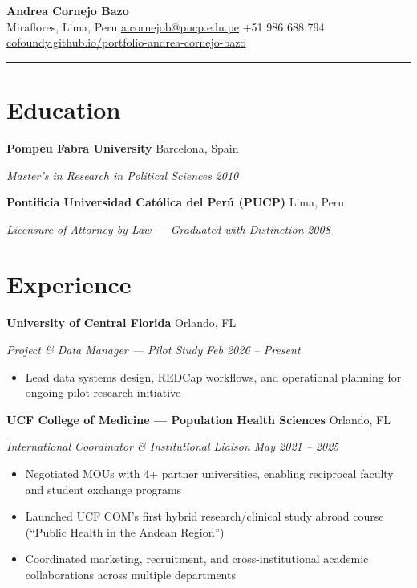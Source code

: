 \documentclass[10pt,letterpaper]{article}
\newcommand{\entry}[4]{%
  \noindent\textbf{#1} \hfill #2 \par\nopagebreak
  \textit{#3} \hfill \textit{#4} \par\nopagebreak
}
\begin{document}
\begin{center}
  {\LARGE\bfseries Andrea Cornejo Bazo} \\[3pt]
  \enspace Miraflores, Lima, Peru
  \quad{}\enspace \href{mailto:a.cornejob@pucp.edu.pe}{a.cornejob@pucp.edu.pe}
  \quad{}\enspace +51 986 688 794
  \\[2pt]
  \enspace \href{https://cofoundy.github.io/portfolio-andrea-cornejo-bazo}{cofoundy.github.io/portfolio-andrea-cornejo-bazo}
\end{center}

\vspace{-0.4em}
\noindent\rule{\textwidth}{0.8pt}
\vspace{-0.6em}

\section{Education}

\entry{Pompeu Fabra University}{Barcelona, Spain}{Master's in Research in Political Sciences}{2010}
\vspace{0.2em}

\entry{Pontificia Universidad Cat\'olica del Per\'u (PUCP)}{Lima, Peru}{Licensure of Attorney by Law --- Graduated with Distinction}{2008}
\vspace{0.2em}

\section{Experience}

\entry{University of Central Florida}{Orlando, FL}{Project \& Data Manager --- Pilot Study}{Feb 2026 -- Present}
\begin{itemize}
  \item Lead data systems design, REDCap workflows, and operational planning for ongoing pilot research initiative
\end{itemize}
\vspace{0.2em}

\entry{UCF College of Medicine --- Population Health Sciences}{Orlando, FL}{International Coordinator \& Institutional Liaison}{May 2021 -- 2025}
\begin{itemize}
  \item Negotiated MOUs with 4+ partner universities, enabling reciprocal faculty and student exchange programs
  \item Launched UCF COM's first hybrid research/clinical study abroad course (``Public Health in the Andean Region'')
  \item Coordinated marketing, recruitment, and cross-institutional academic collaborations across multiple departments
\end{itemize}
\vspace{0.2em}
\end{document}
